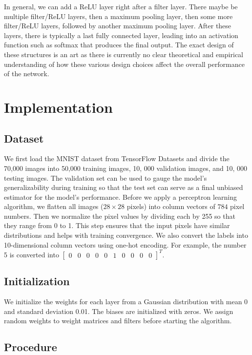 \documentclass{article}
\begin{document}
In general, we can add a ReLU layer right after a filter layer. There maybe be multiple filter/ReLU layers, then a maximum pooling layer, then some more filter/ReLU layers, followed by another maximum pooling layer. After these layers, there is typically a last fully connected layer, leading into an activation function such as softmax that produces the final output. The exact design of these structures is an art as there is currently no clear theoretical and empirical understanding of how these various design choices affect the overall performance of the network.

\section{Implementation}

\subsection{Dataset}

We first load the MNIST dataset from TensorFlow Datasets and divide the 70,000 images into 50,000 training images, 10, 000 validation images, and 10, 000 testing images. The validation set can be used to gauge the model's generalizability during training so that the test set can serve as a final unbiased estimator for the model's performance. Before we apply a perceptron learning algorithm, we flatten all images ($28\times 28$ pixels) into column vectors of $784$ pixel numbers. Then we normalize the pixel values by dividing each by 255 so that they range from 0 to 1. This step ensures that the input pixels have similar distributions and helps with training convergence. We also convert the labels into 10-dimensional column vectors using one-hot encoding. For example, the number 5 is converted into $\left[\begin{array}{cccccccccc} 0&0&0&0&0&1&0&0&0&0\end{array}\right]^T$.

\subsection{Initialization}
We initialize the weights for each layer from a Gaussian distribution with mean 0 and standard deviation 0.01. The biases are initialized with zeros. We assign random weights to weight matrices and filters before starting the algorithm.

\subsection{Procedure}
\end{document}
